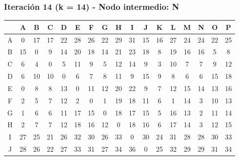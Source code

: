 \documentclass[12pt]{article}
\begin{document}
\subsubsection{Iteración 14 (k = 14) - Nodo intermedio: N}
\begin{table}[h!]
\centering
\begin{tabular}{|c|c|c|c|c|c|c|c|c|c|c|c|c|c|c|c|c|}
\hline
 & A & B & C & D & E & F & G & H & I & J & K & L & M & N & O & P \\\hline
A & 0 & 17 & 17 & 22 & 28 & 26 & 22 & 29 & 31 & 15 & 16 & 27 & 24 & 24 & 22 & 25 \\\hline
B & 15 & 0 & 9 & 14 & 20 & 18 & 14 & 21 & 23 & 18 & 8 & 19 & 16 & 16 & 5 & 8 \\\hline
C & 6 & 4 & 0 & 5 & 11 & 9 & 5 & 12 & 14 & 9 & 3 & 10 & 7 & 7 & 9 & 12 \\\hline
D & 6 & \cellcolor{lightgreen} 10 & \cellcolor{lightgreen} 10 & 0 & 6 & 7 & 8 & 11 & 9 & 15 & \cellcolor{lightgreen} 9 & 8 & 6 & 6 & \cellcolor{lightgreen} 15 & \cellcolor{lightgreen} 18 \\\hline
E & 0 & 8 & 8 & 13 & 0 & 11 & 12 & 20 & 22 & 9 & 7 & 12 & 15 & 14 & 13 & 16 \\\hline
F & 2 & 5 & \cellcolor{lightgreen} 7 & \cellcolor{lightgreen} 12 & 2 & 0 & 1 & \cellcolor{lightgreen} 19 & \cellcolor{lightgreen} 18 & 11 & \cellcolor{lightgreen} 6 & 1 & \cellcolor{lightgreen} 14 & 3 & 10 & 13 \\\hline
G & 1 & \cellcolor{lightgreen} 6 & \cellcolor{lightgreen} 6 & \cellcolor{lightgreen} 11 & \cellcolor{lightgreen} 17 & \cellcolor{lightgreen} 15 & 0 & \cellcolor{lightgreen} 18 & \cellcolor{lightgreen} 17 & \cellcolor{lightgreen} 15 & \cellcolor{lightgreen} 5 & \cellcolor{lightgreen} 16 & \cellcolor{lightgreen} 13 & 2 & \cellcolor{lightgreen} 11 & \cellcolor{lightgreen} 14 \\\hline
H & 2 & \cellcolor{lightgreen} 7 & \cellcolor{lightgreen} 7 & \cellcolor{lightgreen} 12 & \cellcolor{lightgreen} 18 & \cellcolor{lightgreen} 16 & \cellcolor{lightgreen} 12 & 0 & \cellcolor{lightgreen} 18 & \cellcolor{lightgreen} 16 & \cellcolor{lightgreen} 6 & \cellcolor{lightgreen} 17 & \cellcolor{lightgreen} 14 & 3 & \cellcolor{lightgreen} 12 & \cellcolor{lightgreen} 15 \\\hline
I & 27 & 25 & 21 & 26 & 32 & 30 & 26 & 33 & 0 & 30 & 24 & 31 & 28 & 28 & 30 & 33 \\\hline
J & 28 & 26 & 22 & 27 & 33 & 31 & 27 & 34 & 36 & 0 & 25 & 32 & 29 & 29 & 31 & 34 \\\hline

\end{tabular}
\end{table}
\end{document}
